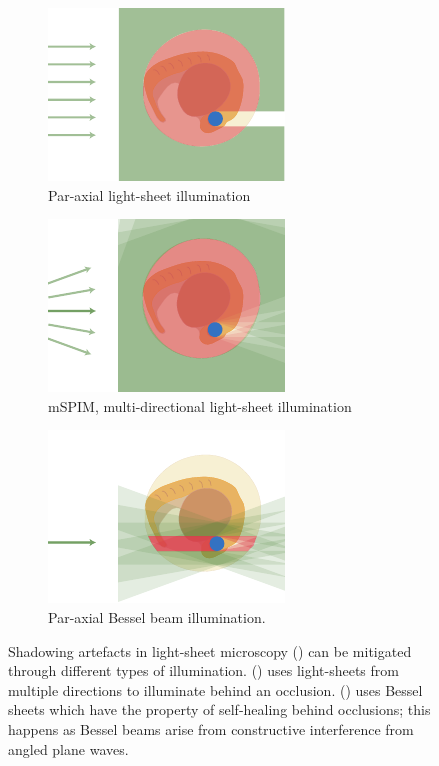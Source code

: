 \begin{figure}
	\centering
    \begin{subfigure}[t]{0.3\textwidth}
        \centering
        \includegraphics{exotic_beams_cartoon_para}
        \caption{Par-axial \gls{light-sheet} illumination}\label{fig:exotic_beams_cartoon_para}
    \end{subfigure}
    \hfill
    \begin{subfigure}[t]{0.3\textwidth}
        \centering
        \includegraphics{exotic_beams_cartoon_mspim}
        \caption{\gls{mSPIM}, multi-directional \gls{light-sheet} illumination}\label{fig:exotic_beams_cartoon_mspim}
    \end{subfigure}
    \hfill
    \begin{subfigure}[t]{0.3\textwidth}
        \centering
        \includegraphics{exotic_beams_cartoon_exotic}
        \caption{Par-axial Bessel beam illumination.}\label{fig:exotic_beams_cartoon_exotic}
    \end{subfigure}
    \caption[Shadowing artefacts in light-sheet can be mitigated through different types of illumination]{
    Shadowing artefacts in light-sheet microscopy () can be mitigated through different types of illumination.
    () uses \gls{light-sheet}s from multiple directions to illuminate behind an occlusion.
    () uses Bessel sheets which have the property of self-healing behind occlusions; this happens as Bessel beams arise from constructive interference from angled plane waves.%
    }\label{fig:scatteringandshadowing}
\end{figure}

